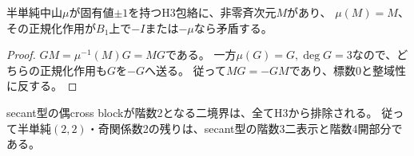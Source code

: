 \begin{lemma}\label{lem:h3-order2-fixed-normal-obstruction}
半単純中山$\mu$が固有値$\pm1$を持つH3包絡に、非零斉次元$M$があり、
$\mu(M)=M$、その正規化作用が$B_1$上で$-I$または$-\mu$なら矛盾する。
\end{lemma}
\begin{proof}
$G M=\mu^{-1}(M)G=MG$である。
一方$\mu(G)=G,\deg G=3$なので、どちらの正規化作用も$G$を$-G$へ送る。
従って$MG=-GM$であり、標数0と整域性に反する。
\end{proof}

\begin{theorem}\label{thm:h3-order2-22-secant-rank2-exclusion}
secant型の偶cross blockが階数2となる二境界は、全てH3から排除される。
従って半単純$(2,2)$・奇関係数2の残りは、secant型の階数3二表示と階数4開部分である。
\end{theorem}
